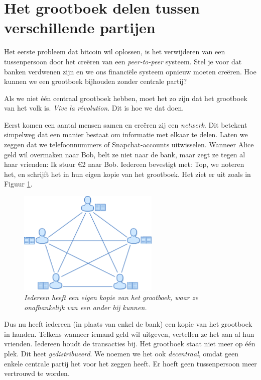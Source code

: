 \documentclass[smalldemyvopaper,11pt,twoside,onecolumn,openright,extrafontsizes]{memoir}
\begin{document}
\section{Het grootboek delen tussen verschillende partijen}

Het eerste probleem dat bitcoin wil oplossen, is het verwijderen van een tussenpersoon door het creëren van een \textit{peer-to-peer} systeem. Stel je voor dat banken verdwenen zijn en we ons financiële systeem opnieuw moeten creëren. Hoe kunnen we een grootboek bijhouden zonder centrale partij?

Als we niet één centraal grootboek hebben, moet het zo zijn dat het grootboek van het volk is. \textit{Vive la révolution}. Dit is hoe we dat doen.

Eerst komen een aantal mensen samen en creëren zij een \textit{netwerk}. Dit betekent simpelweg dat een manier bestaat om informatie met elkaar te delen. Laten we zeggen dat we telefoonnummers of Snapchat-accounts uitwisselen. Wanneer Alice geld wil overmaken naar Bob, belt ze niet naar de bank, maar zegt ze tegen al haar vrienden: \textquotedbl{}Ik stuur €2 naar Bob\textquotedbl{}. Iedereen bevestigt met: \textquotedbl{}Top, we noteren het\textquotedbl{}, en schrijft het in hun eigen kopie van het grootboek. Het ziet er uit zoals in Figuur \ref{fig3}.

\begin{figure}
    \centering
    \includegraphics[width=0.6\textwidth]{images/fig3.png}
    \caption{\footnotesize{\textit{Iedereen heeft een eigen kopie van het grootboek, waar ze onafhankelijk van een ander bij kunnen.}}}
    \label{fig3}
\end{figure}

Dus nu heeft iedereen (in plaats van enkel de bank) een kopie van het grootboek in handen. Telkens wanneer iemand geld wil uitgeven, vertellen ze het aan al hun vrienden. Iedereen houdt de transacties bij. Het grootboek staat niet meer op één plek. Dit heet \textit{gedistribueerd}. We noemen we het ook \textit{decentraal}, omdat geen enkele centrale partij het voor het zeggen heeft. Er hoeft geen tussenpersoon meer vertrouwd te worden.
\end{document}
